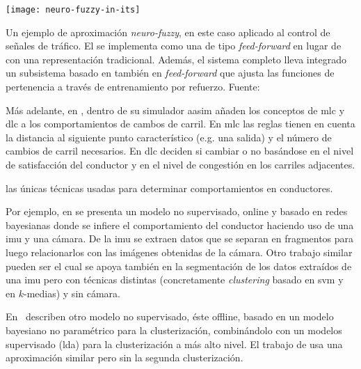 \begin{marginfigure}
	\texttt{[image: neuro-fuzzy-in-its]}
	\caption[Ejemplo de aproximación \textit{neuro-fuzzy} al control de señales de tráfico]{Un ejemplo de aproximación \textit{neuro-fuzzy}, en este caso aplicado al control de señales de tráfico. El  se implementa como una  de tipo \textit{feed-forward} en lugar de con una representación tradicional. Además, el sistema completo lleva integrado un subsistema basado en también en  \textit{feed-forward} que ajusta las funciones de pertenencia a través de entrenamiento por refuerzo. Fuente: \cite{bingham2001reinforcement}}
	\label{fig:neuro-fuzzy-in-its}
\end{marginfigure}

Más adelante, en \cite{Das2009}, dentro de su simulador \gls{aasim} añaden los conceptos de \gls{mlc} y \gls{dlc} a los comportamientos de cambos de carril. En \gls{mlc} las reglas tienen en cuenta la distancia al siguiente punto característico (e.g. una salida) y el número de cambios de carril necesarios. En \gls{dlc} deciden si cambiar o no basándose en el nivel de satisfacción del conductor y en el nivel de congestión en los carriles adjacentes.

 las únicas técnicas usadas para determinar comportamientos en conductores.

Por ejemplo, en \cite{maye2011bayesian} se presenta un modelo no supervisado, online y basado en redes bayesianas donde se infiere el comportamiento del conductor haciendo uso de una \gls{imu} y una cámara. De la \gls{imu} se extraen datos que se separan en fragmentos para luego relacionarlos con las imágenes obtenidas de la cámara. Otro trabajo similar pueden ser \cite{van2013driver} el cual se apoya también en la segmentación de los datos extraídos de una \gls{imu} pero con técnicas distintas (concretamente \textit{clustering} basado en \gls{svm} y en $k$-medias) y sin cámara.

En~\cite{bando2013unsupervised} describen otro modelo no supervisado, éste offline, basado en un modelo bayesiano no paramétrico para la clusterización, combinándolo con un modelos supervisado (\gls{lda}) para la clusterización a más alto nivel. El trabajo de \cite{bender2015unsupervised} usa una aproximación similar pero sin la segunda clusterización.

